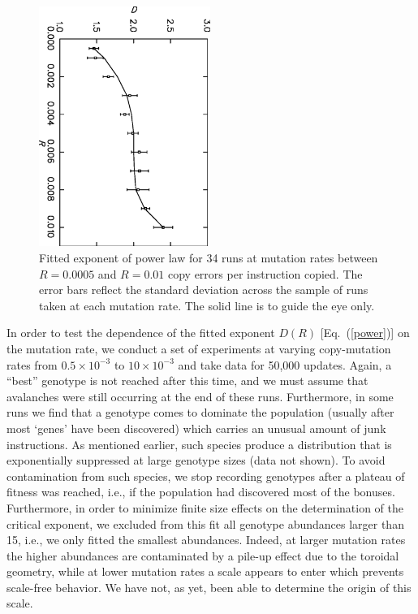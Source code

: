 \documentclass[letterpaper]{article}
\begin{document}
\begin{figure}[t]
\begin{center}
\includegraphics[width=2.2in, angle=90]{fig5.eps}
\vskip 0.25cm
\caption{Fitted exponent of power law for 34 runs at mutation rates
  between $R=0.0005$ and $R=0.01$ copy errors per instruction
  copied. The error bars reflect the standard deviation across the
  sample of runs taken at each mutation rate. The solid line is to
  guide the eye only.
}
\label{fig5}
\end{center}
\end{figure}


In order to test the dependence of the fitted exponent $D(R)$
[Eq.~(\ref{power})] on the mutation rate, we conduct a set of
experiments at varying copy-mutation rates from $0.5\times10^{-3}$ to
$10\times10^{-3}$ and take data for 50,000 updates. Again, a ``best''
genotype is not reached after this time, and we must assume that
avalanches were still occurring at the end of these runs. Furthermore,
in some runs we find that a genotype comes to dominate the population
(usually after most `genes' have been discovered) which carries an
unusual amount of junk instructions. As mentioned earlier, such
species produce a distribution that is exponentially suppressed at
large genotype sizes (data not shown). To avoid contamination from
such species, we stop recording genotypes after a plateau of fitness
was reached, i.e., if the population had discovered most of the
bonuses. Furthermore, in order to minimize finite size effects on the
determination of the critical exponent, we excluded from this fit all
genotype abundances larger than 15, i.e., we only fitted the smallest
abundances. Indeed, at larger mutation rates the higher abundances are
contaminated by a pile-up effect due to the toroidal geometry, while
at lower mutation rates a scale appears to enter which prevents
scale-free behavior. We have not, as yet, been able to determine the
origin of this scale.
\end{document}
